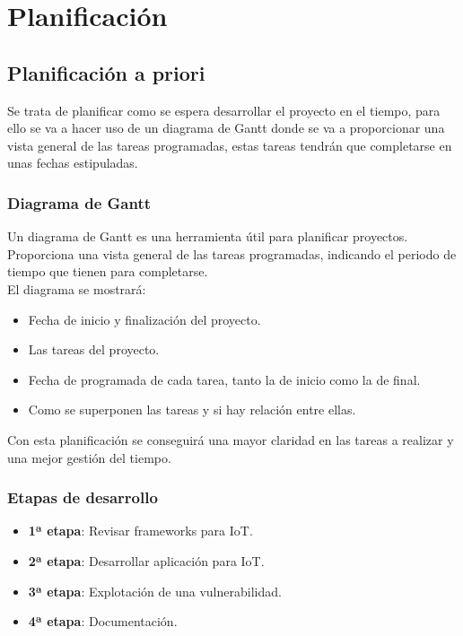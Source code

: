 \chapter{Planificación}

\section{Planificación a priori}

Se trata de planificar como se espera desarrollar el proyecto en el tiempo, para ello se va a hacer uso de un diagrama de Gantt donde se va a proporcionar una vista general de las tareas programadas, estas tareas tendrán que completarse en unas fechas estipuladas.

\subsection{Diagrama de Gantt}

Un diagrama de Gantt es una herramienta útil para planificar proyectos. Proporciona una vista general de las tareas programadas, indicando el periodo de tiempo que tienen para completarse.\\

El diagrama se mostrará:
\begin{itemize}
    \item Fecha de inicio y finalización del proyecto.
    \item Las tareas del proyecto.
    \item Fecha de programada de cada tarea, tanto la de inicio como la de final.
    \item Como se superponen las tareas y si hay relación entre ellas.
\end{itemize}

Con esta planificación se conseguirá una mayor claridad en las tareas a realizar y una mejor gestión del tiempo.

\subsection{Etapas de desarrollo}

\begin{itemize}
    \item \textbf{1ª etapa}: Revisar frameworks para IoT.
    \item \textbf{2ª etapa}: Desarrollar aplicación para IoT.
    \item \textbf{3ª etapa}: Explotación de una vulnerabilidad.
    \item \textbf{4ª etapa}: Documentación.
\end{itemize}


